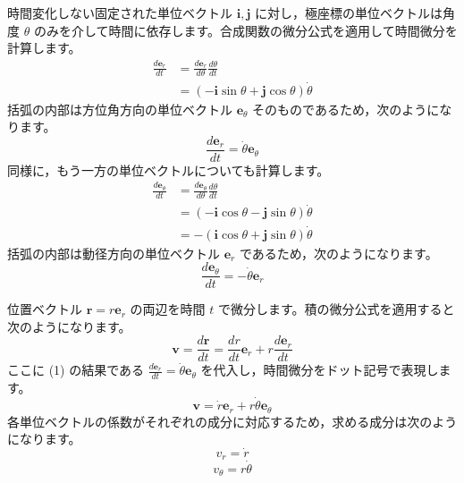 \solutionheading
\begin{solutionparts}

時間変化しない固定された単位ベクトル $\boldsymbol{i}, \boldsymbol{j}$ に対し，極座標の単位ベクトルは角度 $\theta$ のみを介して時間に依存します。合成関数の微分公式を適用して時間微分を計算します。
\begin{align*}
\frac{d\boldsymbol{e}_r}{dt}
  &= \frac{d\boldsymbol{e}_r}{d\theta}\frac{d\theta}{dt} \\
  &= (-\boldsymbol{i}\sin\theta+\boldsymbol{j}\cos\theta)\dot{\theta}
\end{align*}
括弧の内部は方位角方向の単位ベクトル $\boldsymbol{e}_\theta$ そのものであるため，次のようになります。
\begin{equation*}
\frac{d\boldsymbol{e}_r}{dt} = \dot{\theta} \boldsymbol{e}_\theta
\end{equation*}
同様に，もう一方の単位ベクトルについても計算します。
\begin{align*}
\frac{d\boldsymbol{e}_\theta}{dt}
  &= \frac{d\boldsymbol{e}_\theta}{d\theta}\frac{d\theta}{dt} \\
  &= (-\boldsymbol{i}\cos\theta-\boldsymbol{j}\sin\theta)\dot{\theta} \\
  &= -(\boldsymbol{i}\cos\theta+\boldsymbol{j}\sin\theta)\dot{\theta}
\end{align*}
括弧の内部は動径方向の単位ベクトル $\boldsymbol{e}_r$ であるため，次のようになります。
\begin{equation*}
\frac{d\boldsymbol{e}_\theta}{dt} = -\dot{\theta} \boldsymbol{e}_r
\end{equation*}

位置ベクトル $\boldsymbol{r} = r \boldsymbol{e}_r$ の両辺を時間 $t$ で微分します。積の微分公式を適用すると次のようになります。
\begin{equation*}
\boldsymbol{v} = \frac{d\boldsymbol{r}}{dt} = \frac{dr}{dt} \boldsymbol{e}_r + r \frac{d\boldsymbol{e}_r}{dt}
\end{equation*}
ここに (1) の結果である $\frac{d\boldsymbol{e}_r}{dt} = \dot{\theta} \boldsymbol{e}_\theta$ を代入し，時間微分をドット記号で表現します。
\begin{equation*}
\boldsymbol{v} = \dot{r} \boldsymbol{e}_r + r \dot{\theta} \boldsymbol{e}_\theta
\end{equation*}
各単位ベクトルの係数がそれぞれの成分に対応するため，求める成分は次のようになります。
\begin{equation*}
v_r = \dot{r}
\end{equation*}
\begin{equation*}
v_\theta = r \dot{\theta}
\end{equation*}


\end{solutionparts}
